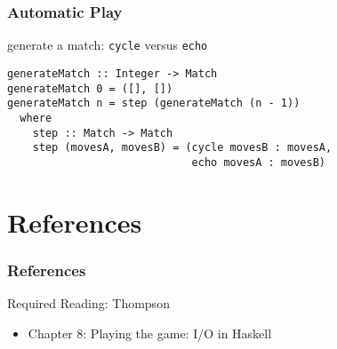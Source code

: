 \documentclass[dvipsnames]{beamer}
\theoremstyle{plain}
\begin{document}
\begin{frame}[fragile]
  \frametitle{Automatic Play}

  \begin{exampleblock}{generate a match:
      \lstinline[deletekeywords={cycle}]|cycle| versus \lstinline|echo|}
    \begin{lstlisting}[deletekeywords={cycle}]
generateMatch :: Integer -> Match
generateMatch 0 = ([], [])
generateMatch n = step (generateMatch (n - 1))
  where
    step :: Match -> Match
    step (movesA, movesB) = (cycle movesB : movesA,
                             echo movesA : movesB)
    \end{lstlisting}
  \end{exampleblock}
\end{frame}

\section*{References}

\begin{frame}
  \frametitle{References}

  \begin{block}{Required Reading: Thompson}
    \begin{itemize}
      \item Chapter 8: \alert{Playing the game: I/O in Haskell}
    \end{itemize}
  \end{block}
\end{frame}
\end{document}
